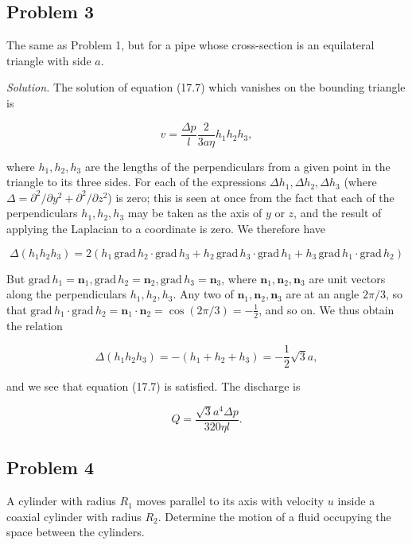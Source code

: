 \documentclass{article}
\begin{document}
\subsection*{Problem 3}

The same as Problem 1, but for a pipe whose cross-section is an equilateral triangle with side $a$.

\textit{Solution.} The solution of equation (17.7) which vanishes on the bounding triangle is

$$
v = \frac{\Delta p}{l} \frac{2}{3a\eta} h_1 h_2 h_3,
$$

where $h_1, h_2, h_3$ are the lengths of the perpendiculars from a given point in the triangle to its three sides. For each of the expressions $\Delta h_1, \Delta h_2, \Delta h_3$ (where $\Delta = \partial^2/\partial y^2 + \partial^2/\partial z^2$) is zero; this is seen at once from the fact that each of the perpendiculars $h_1, h_2, h_3$ may be taken as the axis of $y$ or $z$, and the result of applying the Laplacian to a coordinate is zero. We therefore have

$$
\Delta (h_1 h_2 h_3) = 2(h_1 \, \text{grad} \, h_2 \cdot \text{grad} \, h_3 + h_2 \, \text{grad} \, h_3 \cdot \text{grad} \, h_1 + h_3 \, \text{grad} \, h_1 \cdot \text{grad} \, h_2)
$$

But $\text{grad} \, h_1 = \mathbf{n}_1, \text{grad} \, h_2 = \mathbf{n}_2, \text{grad} \, h_3 = \mathbf{n}_3$, where $\mathbf{n}_1, \mathbf{n}_2, \mathbf{n}_3$ are unit vectors along the perpendiculars $h_1, h_2, h_3$. Any two of $\mathbf{n}_1, \mathbf{n}_2, \mathbf{n}_3$ are at an angle $2\pi/3$, so that $\text{grad} \, h_1 \cdot \text{grad} \, h_2 = \mathbf{n}_1 \cdot \mathbf{n}_2 = \cos(2\pi/3) = -\frac{1}{2}$, and so on. We thus obtain the relation

$$
\Delta (h_1 h_2 h_3) = -(h_1 + h_2 + h_3) = -\frac{1}{2} \sqrt{3} a,
$$

and we see that equation (17.7) is satisfied. The discharge is

$$
Q = \frac{\sqrt{3} a^4 \Delta p}{320 \eta l}.
$$

\subsection*{Problem 4}

A cylinder with radius $R_1$ moves parallel to its axis with velocity $u$ inside a coaxial cylinder with radius $R_2$. Determine the motion of a fluid occupying the space between the cylinders.
\end{document}
